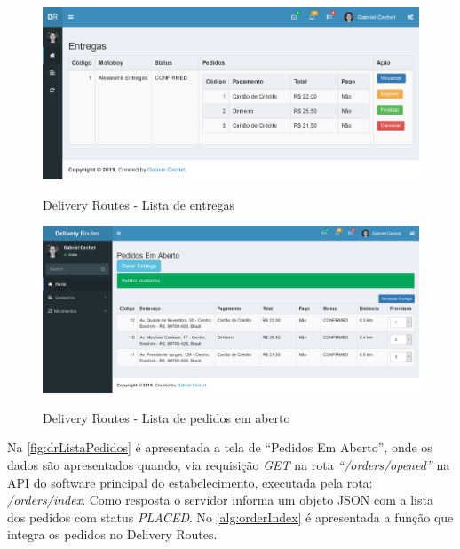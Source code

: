  \begin{figure}[H]
    \centering
    \caption{Delivery Routes - Lista de entregas}
    \includegraphics[width=1.0\textwidth]{./dados/figuras/fig26}
    \label{fig:drListaEntregas}
\end{figure}

 \begin{figure}[H]
    \centering
    \caption{Delivery Routes - Lista de pedidos em aberto}
    \includegraphics[width=1.0\textwidth]{./dados/figuras/fig29}
    \label{fig:drListaPedidos}
\end{figure}

\newpage
Na \autoref{fig:drListaPedidos} é apresentada a tela de “Pedidos Em Aberto”, onde os dados são apresentados quando, via requisição \textit{GET} na rota \textit{“/orders/opened”} na API do software principal do estabelecimento, executada pela rota: \textit{/orders/index}. Como resposta o servidor informa um objeto JSON com a lista dos pedidos com status \textit{PLACED}. No \autoref{alg:orderIndex} é apresentada a função que integra os pedidos no Delivery Routes.

